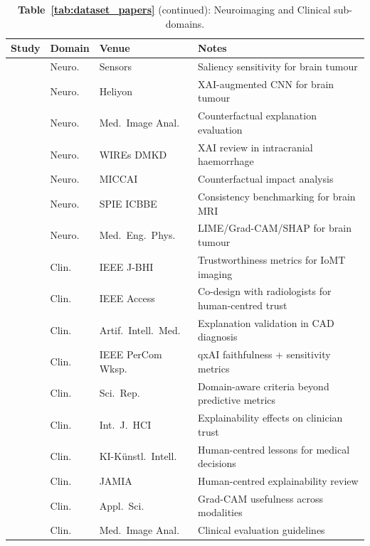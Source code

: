 \begin{table}[htbp]
\centering
\caption*{\textbf{Table~\ref{tab:dataset_papers}} (continued): Neuroimaging and Clinical sub-domains.}
\small
\renewcommand{\arraystretch}{1.05}
\begin{tabularx}{\textwidth}{@{}p{1.6cm}p{1.2cm}p{2.8cm}X@{}}
\toprule
\textbf{Study} & \textbf{Domain} & \textbf{Venue} & \textbf{Notes} \\
\midrule
\cite{Chmiel2023} & Neuro. & Sensors & Saliency sensitivity for brain tumour \\
\cite{Nazir2024UtilizingCC} & Neuro. & Heliyon & XAI-augmented CNN for brain tumour \\
\cite{singla2023explaining} & Neuro. & Med.\ Image Anal. & Counterfactual explanation evaluation \\
\cite{Kohan2025} & Neuro. & WIREs DMKD & XAI review in intracranial haemorrhage \\
\cite{lenis2020domain} & Neuro. & MICCAI & Counterfactual impact analysis \\
\cite{qin2025consistency} & Neuro. & SPIE ICBBE & Consistency benchmarking for brain MRI \\
\cite{akgundougdu2025explainable} & Neuro. & Med.\ Eng.\ Phys. & LIME/Grad-CAM/SHAP for brain tumour \\
\addlinespace[2pt]
\cite{10328849} & Clin. & IEEE J-BHI & Trustworthiness metrics for IoMT imaging \\
\cite{11355720} & Clin. & IEEE Access & Co-design with radiologists for human-centred trust \\
\cite{Kukar2011} & Clin. & Artif.\ Intell.\ Med. & Explanation validation in CAD diagnosis \\
\cite{Pandey2024} & Clin. & IEEE PerCom Wksp. & qxAI faithfulness + sensitivity metrics \\
\cite{hicks2022evaluation} & Clin. & Sci.\ Rep. & Domain-aware criteria beyond predictive metrics \\
\cite{rezaeian2026explainability} & Clin. & Int.\ J.\ HCI & Explainability effects on clinician trust \\
\cite{finzel2024human} & Clin. & KI-K{\"u}nstl.\ Intell. & Human-centred lessons for medical decisions \\
\cite{bauer2025human} & Clin. & JAMIA & Human-centred explainability review \\
\cite{chien2022usefulness} & Clin. & Appl.\ Sci. & Grad-CAM usefulness across modalities \\
\cite{jin2023guidelines} & Clin. & Med.\ Image Anal. & Clinical evaluation guidelines \\

\end{tabularx}
\end{table}
